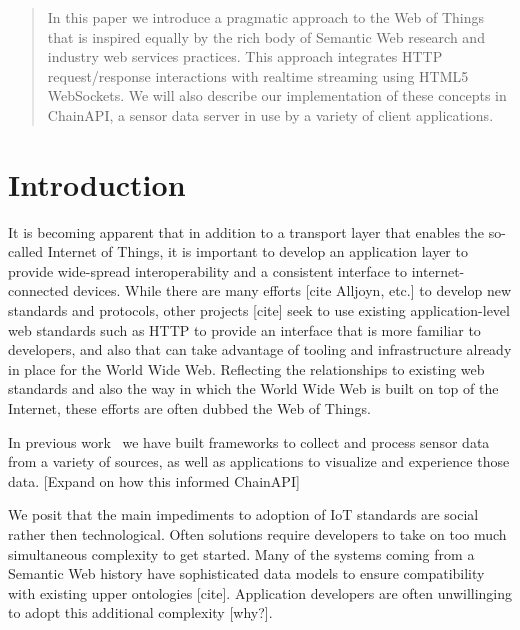 \documentclass{acm_proc_article-sp}
\begin{document}
\begin{abstract}
In this paper we introduce a pragmatic approach to the Web of Things that is
inspired equally by the rich body of Semantic Web research and industry web
services practices. This approach integrates HTTP request/response interactions
with realtime streaming using HTML5 WebSockets. We will also describe our
implementation of these concepts in ChainAPI, a sensor data server in use by
a variety of client applications.
\end{abstract}

%
%

\section{Introduction}

It is becoming apparent that in addition to a transport layer that enables the
so-called Internet of Things, it is important to develop an application layer
to provide wide-spread interoperability and a consistent interface to
internet-connected devices. While there are many efforts [cite Alljoyn, etc.]
to develop new standards and protocols, other projects [cite] seek to use
existing application-level web standards such as HTTP to provide an interface
that is more familiar to developers, and also that can take advantage of
tooling and infrastructure already in place for the World Wide Web. Reflecting
the relationships to existing web standards and also the way in which the World
Wide Web is built on top of the Internet, these efforts are often dubbed the
Web of Things.

In previous work~\cite{doppellab}\cite{gestures} we have built frameworks to collect
and process sensor data from a variety of sources, as well as applications to
visualize and experience those data. [Expand on how this informed ChainAPI]

We posit that the main impediments to adoption of IoT standards are social
rather then technological. Often  solutions require developers to take on too much
simultaneous complexity to get started. Many of the systems coming from a Semantic
Web history have sophisticated data models to ensure compatibility with existing
upper ontologies [cite]. Application developers are often unwillinging to adopt
this additional complexity [why?].
\end{document}
